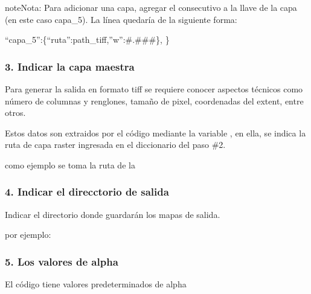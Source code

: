 \documentclass[letterpaper,10pt,spanish]{sphinxmanual}
\begin{document}
\begin{sphinxadmonition}{note}{Nota:}
Para adicionar una capa, agregar el consecutivo
a la llave de la capa (en este caso capa\_5).
La línea quedaría de la siguiente forma:

“capa\_5”:\{“ruta”:path\_tiff,”w”:\#.\#\#\#\},
\}
\end{sphinxadmonition}


\subsubsection{3. Indicar la capa maestra}
\label{\detokenize{owa:indicar-la-capa-maestra}}
Para generar la salida en formato tiff se requiere conocer aspectos
técnicos como número de columnas y renglones, tamaño de pixel, coordenadas
del extent, entre otros.

Estos datos son extraidos por el código mediante la variable ,
en ella, se indica la ruta de  capa raster ingresada en el diccionario del
paso \#2.

como ejemplo se toma la ruta de la 

\begin{sphinxVerbatim}[commandchars=\\\{\}]
  
\end{sphinxVerbatim}


\subsubsection{4. Indicar el direcctorio de salida}
\label{\detokenize{owa:indicar-el-direcctorio-de-salida}}
Indicar el directorio donde guardarán los mapas de salida.

por ejemplo:

\begin{sphinxVerbatim}[commandchars=\\\{\}]
  
\end{sphinxVerbatim}


\subsubsection{5. Los valores de alpha}
\label{\detokenize{owa:los-valores-de-alpha}}
El código tiene valores  predeterminados de alpha
\end{document}
